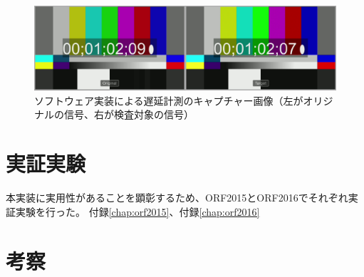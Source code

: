 \begin{figure}[htbp]
  \begin{center}
    \includegraphics[bb=0 0 1920 540,width=14cm]{img/evaluate-delay-software-2.png}
  \end{center}
  \caption[ソフトウェア実装による遅延計測のキャプチャー画像]{ソフトウェア実装による遅延計測のキャプチャー画像（左がオリジナルの信号、右が検査対象の信号）}
  \label{fig:evaluate-delay-software-2}
\end{figure}


\section{実証実験}
本実装に実用性があることを顕彰するため、ORF2015とORF2016でそれぞれ実証実験を行った。
付録\ref{chap:orf2015}、付録\ref{chap:orf2016}

\section{考察}
